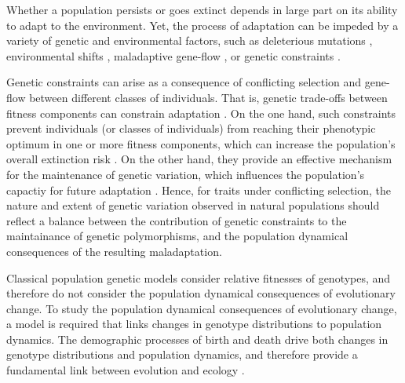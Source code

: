 \documentclass[11pt]{article}
\begin{document}
 Whether a population persists or goes extinct depends in large part on its ability to adapt to the environment. Yet, the process of adaptation can be impeded by a variety of genetic and environmental factors, such as deleterious mutations \citep{Haldane1957}, environmental shifts \citep{Maynard-Smith1976, LandeShannon1996,OrrUnckless2008}, maladaptive gene-flow \citep{KirkpatrickBarton1997, BolnickNosil2007}, or genetic constraints \citep{ConnallonHall2018}. 



Genetic constraints can arise as a consequence of conflicting selection and gene-flow between different classes of individuals. That is, genetic trade-offs between fitness components can constrain adaptation \citep{CharlesworthHughes2000, ConnallonHall2018}. On the one hand, such constraints prevent individuals (or classes of individuals) from reaching their phenotypic optimum in one or more fitness components, which can increase the population's overall extinction risk \citep{holman2013consequences,harts2014demography}. On the other hand, they provide an effective mechanism for the maintenance of genetic variation, which influences the population's capactiy for future adaptation \citep{Fisher1930, CharlesworthHughes2000, ConnallonHall2018, MatthewsConnallon2019}. Hence, for traits under conflicting selection, the nature and extent of genetic variation observed in natural populations should reflect a balance between the contribution of genetic constraints to the maintainance of genetic polymorphisms, and the population dynamical consequences of the resulting maladaptation.

Classical population genetic models consider relative fitnesses of genotypes, and therefore do not consider the population dynamical consequences of evolutionary change. To study the population dynamical consequences of evolutionary change, a model is required that links changes in genotype distributions to population dynamics.  The demographic processes of birth and death drive both changes in genotype distributions and population dynamics, and therefore provide a fundamental link between evolution and ecology \citep{metcalf2007evolutionary}.  
\end{document}
